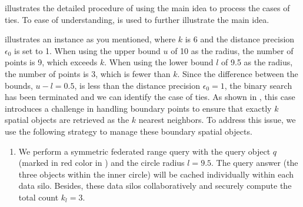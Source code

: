  illustrates the detailed procedure of using the main idea to process the cases of ties.
To ease of understanding,  is used to further illustrate the main idea.

\begin{example}\label{exp:special-knn}
     illustrates an instance as you mentioned,
    where $k$ is 6 and the distance precision $\epsilon_0$ is set to 1.
    When using the upper bound $u$ of 10 as the radius, the number of points is 9, which exceeds $k$. 
    When using the lower bound $l$ of 9.5 as the radius, the number of points is 3, which is fewer than $k$. 
    Since the difference between the bounds, $u-l=0.5$, is less than the distance precision $\epsilon_0=1$, the binary search has been terminated and we can identify the case of ties.
    As shown in , this case introduces a challenge in handling boundary points to ensure that exactly $k$ spatial objects are retrieved as the $k$ nearest neighbors. 
   To address this issue, we use the following strategy to manage these boundary spatial objects. 
   
   \begin{enumerate}[(1)]
    \item
    We perform a symmetric federated range query with the query object $q$ (marked in red color in ) and the circle radius $l = 9.5$.
    The query answer (\ie the three objects within the inner circle) will be cached individually within each data silo.
    Besides, these data silos collaboratively and securely compute the total count $k_l = 3$.
    
    

\end{enumerate}
\end{example}
